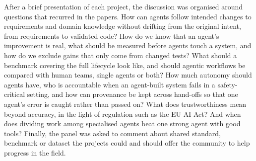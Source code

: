 After a brief presentation of each project, the discussion was organised around questions that recurred in the papers. How can agents follow intended changes to requirements and domain knowledge without drifting from the original intent, from requirements to validated code? How do we know that an agent's improvement is real, what should be measured before agents touch a system, and how do we exclude gains that only come from changed tests? What should a benchmark covering the full lifecycle look like, and should agentic workflows be compared with human teams, single agents or both? How much autonomy should agents have, who is accountable when an agent-built system fails in a safety-critical setting, and how can provenance be kept across hand-offs so that one agent's error is caught rather than passed on? What does trustworthiness mean beyond accuracy, in the light of regulation such as the EU AI Act? And when does dividing work among specialised agents beat one strong agent with good tools? Finally, the panel was asked to comment about shared standard, benchmark or dataset the projects could and should offer the community to help progress in the field. 
